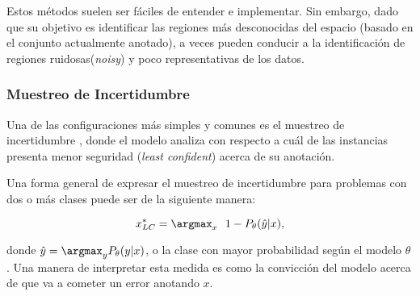 Estos métodos suelen ser fáciles de entender e implementar. Sin embargo, dado que su objetivo es identificar las regiones más desconocidas del espacio (basado en el conjunto actualmente anotado), a veces pueden
conducir a la identificación de regiones ruidosas(\textit{noisy}) y poco representativas de los datos.  

\subsubsection{Muestreo de Incertidumbre}


Una de las configuraciones más simples y comunes es el muestreo de incertidumbre \cite{lewis1994sequential}, donde el modelo analiza con respecto a cuál de las instancias presenta menor seguridad (\textit{least confident}) acerca de su anotación.

%
%

Una forma general de expresar el muestreo de incertidumbre para problemas con dos o más clases puede ser de la siguiente manera:

\begin{equation}
x_{LC}^* =  \argmax_x \ \ {1 - P_{\theta}(\hat{y}|x)},
\end{equation}

donde $ \hat{y} = \argmax_y  P_{\theta}(y|x)$,  o la clase con mayor probabilidad según el modelo $\theta$. Una manera de interpretar esta medida es como la convicción del modelo acerca de que va a cometer un error anotando $x$. 

